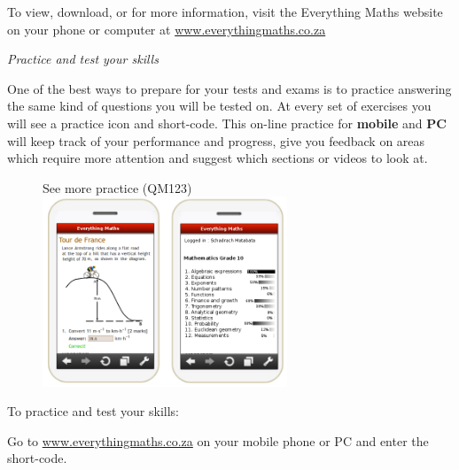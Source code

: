\newpage
\thispagestyle{empty}
{\Large

To view, download, or for more information, visit the Everything Maths website on your phone or
computer at \underline{www.everythingmaths.co.za}  \par
\vspace*{1cm}
{\normalfont\sffamily\fontsize{22}\normalfont\itshape Practice and test your skills} \par


One of the best ways to prepare for your tests and exams is to practice answering the same kind of
questions you will be tested on. At every set of exercises you will see a practice icon and short-code.
This on-line practice for \textbf{mobile} and \textbf{PC} will keep track of your performance and progress, give you
feedback on areas which require more attention and suggest which sections or videos to look at.

\begin{figure}[h]
\begin{center}
See more practice  (QM123)\\ 
\includegraphics[width=0.65\textwidth]{title_images/practicephones.png}
\end{center}
\end{figure}
\par



To practice and test your skills:\par

Go to \underline{www.everythingmaths.co.za} on your mobile phone or PC and enter the short-code.\par

}
